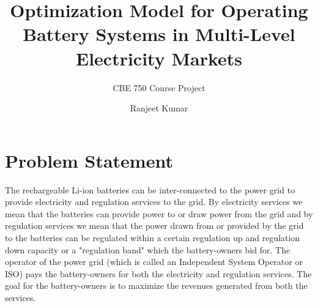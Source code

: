 \documentclass[11pt,twoside]{article}
\title{Optimization Model for Operating Battery Systems in Multi-Level Electricity Markets}
\date{Ranjeet Kumar}
\author{CBE 750 Course Project}
\begin{document}
\maketitle

\section{Problem Statement}
The rechargeable Li-ion batteries can be inter-connected to the power grid to provide electricity and regulation services to the grid. By electricity services we mean that the batteries can provide power to or draw power from the grid and by regulation services we mean that the power drawn from or provided by the grid to the batteries can be regulated within a certain regulation up and regulation down capacity or a "regulation band" which the battery-owners bid for. The operator of the power grid (which is called an Independent System Operator or ISO) pays the battery-owners for both the electricity and regulation services. The goal for the battery-owners is to maximize the revenues generated from both the services.
\end{document}

